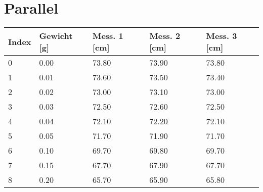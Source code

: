 \documentclass[../main.tex]{subfiles} %
\begin{document}
\section{Parallel}\label{sec:parallel}

\begin{center}
    \begin{tabular}{ |l|l|l|l|l| } \hline\rowcolor{Gray!50}
        Index & Gewicht [g] & Mess. 1 [cm] & Mess. 2 [cm] & Mess. 3 [cm] \\\toprule\hline
        0     & 0.00        & 73.80        & 73.90        & 73.80        \\\hline
        1     & 0.01        & 73.60        & 73.50        & 73.40        \\\hline
        2     & 0.02        & 73.00        & 73.10        & 73.00        \\\hline
        3     & 0.03        & 72.50        & 72.60        & 72.50        \\\hline
        4     & 0.04        & 72.10        & 72.20        & 72.10        \\\hline
        5     & 0.05        & 71.70        & 71.90        & 71.70        \\\hline
        6     & 0.10        & 69.70        & 69.80        & 69.70        \\\hline
        7     & 0.15        & 67.70        & 67.90        & 67.70        \\\hline
        8     & 0.20        & 65.70        & 65.90        & 65.80        \\\hline
    \end{tabular}
\end{center}
\end{document}
